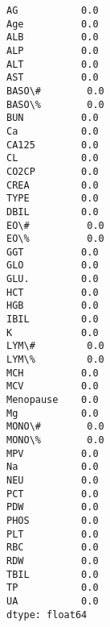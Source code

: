 \documentclass[11pt]{article}
\makeatletter
\newcommand{\boxspacing}{\kern\kvtcb@left@rule\kern\kvtcb@boxsep}
\newcommand{\prompt}[4]{
        {\ttfamily\llap{{\color{#2}[#3]:\hspace{3pt}#4}}\vspace{-\baselineskip}}
    }
\makeatother
\begin{document}
            \begin{tcolorbox}[breakable, size=fbox, boxrule=.5pt, pad at break*=1mm, opacityfill=0]
\prompt{Out}{outcolor}{13}{\boxspacing}
\begin{Verbatim}[commandchars=\\\{\}]
AG           0.0
Age          0.0
ALB          0.0
ALP          0.0
ALT          0.0
AST          0.0
BASO\#        0.0
BASO\%        0.0
BUN          0.0
Ca           0.0
CA125        0.0
CL           0.0
CO2CP        0.0
CREA         0.0
TYPE         0.0
DBIL         0.0
EO\#          0.0
EO\%          0.0
GGT          0.0
GLO          0.0
GLU.         0.0
HCT          0.0
HGB          0.0
IBIL         0.0
K            0.0
LYM\#         0.0
LYM\%         0.0
MCH          0.0
MCV          0.0
Menopause    0.0
Mg           0.0
MONO\#        0.0
MONO\%        0.0
MPV          0.0
Na           0.0
NEU          0.0
PCT          0.0
PDW          0.0
PHOS         0.0
PLT          0.0
RBC          0.0
RDW          0.0
TBIL         0.0
TP           0.0
UA           0.0
dtype: float64
\end{Verbatim}
\end{tcolorbox}
        
\end{document}
